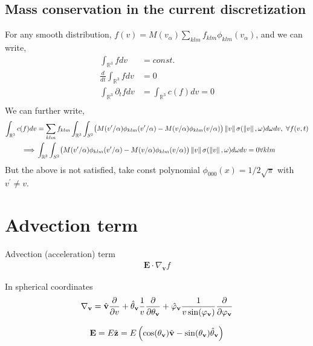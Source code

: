 \documentclass{article}
\newcommand{\vect}[1]{\mathbf{#1}}
\newcommand{\of}[1]{\mleft( #1 \mright)}
\newcommand{\RR}{\mathbb{R}}
\begin{document}
\subsection{Mass conservation in the current discretization}
For any smooth distribution, $f(v) = M(v_\alpha) \sum_{klm} f_{klm} \phi_{klm}(v_\alpha)$, and we can write, 
\begin{align}
    \int_{\RR^3} f dv &= const.  \\
    \frac{d}{dt} \int_{\RR^3} f dv &= 0  \\
    \int_{\RR^3} \partial_t f  dv &= \int_{\RR^3} c(f) dv =0 \\
\end{align}
We can further write, 
\begin{align}
    \int_{\RR^3} c(f) dv  &= \sum_{klm} f_{klm} \int_{\RR^3}\int_{S^2} \bigl( M(v^\prime/\alpha) \phi_{klm}(v^\prime/\alpha) -   M(v/\alpha) \phi_{klm}(v/\alpha) \bigr) \norm{v} \sigma(\norm{v},\omega) d\omega dv, \  \forall f(v,t) \\
    \implies & \int_{\RR^3}\int_{S^2} \bigl( M(v^\prime/\alpha) \phi_{klm}(v^\prime/\alpha) -   M(v/\alpha) \phi_{klm}(v/\alpha) \bigr) \norm{v} \sigma(\norm{v},\omega) d\omega dv =0  \forall klm
\end{align}
But the above is not satisfied, take const polynomial $\phi_{000}(x)=1/2\sqrt{\pi}$ with $v^\prime \neq v$.  

\clearpage
\section{Advection term}
Advection (acceleration) term
\begin{align*}
\vect{E}\cdot \nabla_{\vect{v}} f
\end{align*}

In spherical coordinates
\begin{align*}
\nabla_{\vect{v}} 
= \hat{\vect{v}} \frac{\partial}{\partial v}
+ \hat{\vect{\theta}}_{\vect{v}} \frac{1}{v} \frac{\partial}{\partial \vect{\theta}_{\vect{v}}}
+ \hat{\vect{\varphi}}_{\vect{v}} \frac{1}{v \sin\of{\vect{\varphi}_{\vect{v}}}} \frac{\partial}{\partial \vect{\varphi}_{\vect{v}}}
\end{align*}

\begin{align*}
\vect{E} 
= E \hat{\vect{z}} 
= E \left( \cos\of{\theta_\vect{v}} \hat{\vect{v}} - \sin\of{\theta_\vect{v}} \hat{\vect{\theta}}_\vect{v} \right)
\end{align*}
\end{document}
